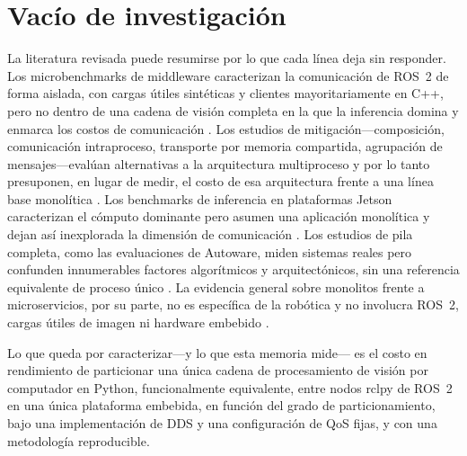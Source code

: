 \section{Vacío de investigación}
\label{sec:gap}

La literatura revisada puede resumirse por lo que cada línea deja sin
responder. Los microbenchmarks de middleware caracterizan la comunicación de
ROS~2 de forma aislada, con cargas útiles sintéticas y clientes
mayoritariamente en C++, pero no dentro de una cadena de visión completa en
la que la inferencia domina y enmarca los costos de comunicación
\cite{maruyama2016, kronauer2021, kamiya2025,luo2025, macenski2022}. Los
estudios de mitigación---composición, comunicación intraproceso,
transporte por memoria compartida, agrupación de mensajes---evalúan
alternativas a la arquitectura multiproceso y por lo tanto presuponen, en
lugar de medir, el costo de esa arquitectura frente a una línea base
monolítica \cite{macenski2023, kamiya2025, luo2025}. Los benchmarks de
inferencia en plataformas Jetson caracterizan el cómputo dominante pero
asumen una aplicación monolítica y dejan así inexplorada la dimensión de
comunicación \cite{szegedi2026, tang2026, alqahtani2026, scalcon2024}. Los
estudios de pila completa, como las evaluaciones de Autoware, miden
sistemas reales pero confunden innumerables factores algorítmicos y
arquitectónicos, sin una referencia equivalente de proceso único
\cite{betz2023a, betz2024}. La evidencia general sobre monolitos frente a
microservicios, por su parte, no es específica de la robótica y no involucra
ROS~2, cargas útiles de imagen ni hardware embebido \cite{tapia2020,
blinowski2022, felisberto2024}.

Lo que queda por caracterizar---y lo que esta memoria mide--- es el costo en
rendimiento de particionar una única cadena de procesamiento de visión por
computador en Python, funcionalmente equivalente, entre nodos rclpy de
ROS~2 en una única plataforma embebida, en función del grado de
particionamiento, bajo una implementación de DDS y una configuración de QoS
fijas, y con una metodología reproducible.
